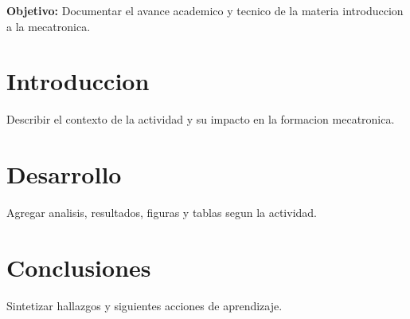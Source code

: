 \documentclass[spanish,letterpaper,oneside]{article}
\begin{document}
\templatePortrait
\templatePagecfg
\onehalfspacing

\begin{abstractd}
\textbf{Objetivo:} Documentar el avance academico y tecnico de la materia introduccion a la mecatronica.
\end{abstractd}

\templateIndex
\templateFinalcfg

\section{Introduccion}
Describir el contexto de la actividad y su impacto en la formacion mecatronica.

\section{Desarrollo}
Agregar analisis, resultados, figuras y tablas segun la actividad.

\section{Conclusiones}
Sintetizar hallazgos y siguientes acciones de aprendizaje.



\end{document}

